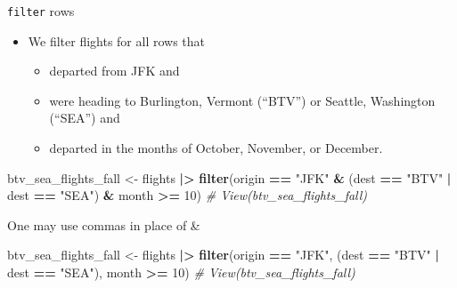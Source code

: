 \documentclass[
  ignorenonframetext,
]{beamer}
\newenvironment{Shaded}{\begin{snugshade}}{\end{snugshade}}
\newcommand{\CommentTok}[1]{\textcolor[rgb]{0.56,0.35,0.01}{\textit{#1}}}
\newcommand{\DecValTok}[1]{\textcolor[rgb]{0.00,0.00,0.81}{#1}}
\newcommand{\FunctionTok}[1]{\textcolor[rgb]{0.13,0.29,0.53}{\textbf{#1}}}
\newcommand{\NormalTok}[1]{#1}
\newcommand{\OtherTok}[1]{\textcolor[rgb]{0.56,0.35,0.01}{#1}}
\newcommand{\SpecialCharTok}[1]{\textcolor[rgb]{0.81,0.36,0.00}{\textbf{#1}}}
\newcommand{\StringTok}[1]{\textcolor[rgb]{0.31,0.60,0.02}{#1}}
\providecommand{\tightlist}{%
  \setlength{\itemsep}{0pt}\setlength{\parskip}{0pt}}
\begin{document}
\begin{frame}[fragile]{\texttt{filter} rows}
\protect\hypertarget{filter-rows-3}{}
\begin{itemize}
\item
  We filter flights for all rows that

  \begin{itemize}
  \tightlist
  \item
    departed from JFK and
  \item
    were heading to Burlington, Vermont (``BTV'') or Seattle, Washington
    (``SEA'') and
  \item
    departed in the months of October, November, or December.
  \end{itemize}
\end{itemize}

\normalsize

\begin{Shaded}
\begin{Highlighting}[]
\NormalTok{btv\_sea\_flights\_fall }\OtherTok{\textless{}{-}}\NormalTok{ flights }\SpecialCharTok{|\textgreater{}} 
  \FunctionTok{filter}\NormalTok{(origin }\SpecialCharTok{==} \StringTok{"JFK"} \SpecialCharTok{\&}\NormalTok{ (dest }\SpecialCharTok{==} \StringTok{"BTV"} \SpecialCharTok{|}\NormalTok{ dest }\SpecialCharTok{==} \StringTok{"SEA"}\NormalTok{) }\SpecialCharTok{\&} 
\NormalTok{         month }\SpecialCharTok{\textgreater{}=} \DecValTok{10}\NormalTok{)}
\CommentTok{\# View(btv\_sea\_flights\_fall)}
\end{Highlighting}
\end{Shaded}

\normalsize

One may use commas in place of \&

\normalsize

\begin{Shaded}
\begin{Highlighting}[]
\NormalTok{btv\_sea\_flights\_fall }\OtherTok{\textless{}{-}}\NormalTok{ flights }\SpecialCharTok{|\textgreater{}} 
  \FunctionTok{filter}\NormalTok{(origin }\SpecialCharTok{==} \StringTok{"JFK"}\NormalTok{, (dest }\SpecialCharTok{==} \StringTok{"BTV"} \SpecialCharTok{|}\NormalTok{ dest }\SpecialCharTok{==} \StringTok{"SEA"}\NormalTok{), }
\NormalTok{         month }\SpecialCharTok{\textgreater{}=} \DecValTok{10}\NormalTok{)}
\CommentTok{\# View(btv\_sea\_flights\_fall)}
\end{Highlighting}
\end{Shaded}

\normalsize
\end{frame}
\end{document}
